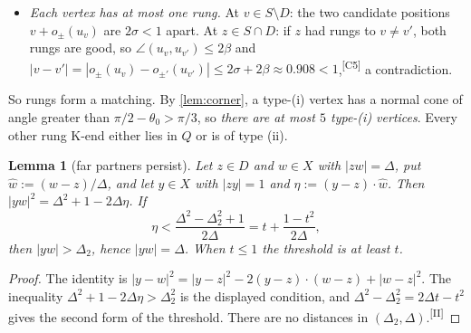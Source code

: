 \documentclass[11pt]{amsart}
\newtheorem{lemma}[theorem]{Lemma}
\theoremstyle{definition}
\theoremstyle{remark}
\newcommand{\Dt}{\Delta_2}
\newcommand{\chk}[1]{\textsuperscript{[#1]}}
\begin{document}
\begin{itemize}[leftmargin=2em]
\item[(R1)] \emph{Each vertex has at most one rung.} At $v\in S\setminus D$: the two candidate positions $v+o_\pm(u_v)$ are $2\sigma<1$ apart. At $z\in S\cap D$: if $z$ had rungs to $v\neq v'$, both rungs are good, so $\angle(u_v,u_{v'})\le2\beta$ and $|v-v'|=|o_{\pm}(u_v)-o_{\pm'}(u_{v'})|\le2\sigma+2\beta\approx0.908<1$,\chk{C5} a contradiction.
\end{itemize}
So rungs form a matching. By \cref{lem:corner}, a type-(i) vertex has a normal cone of angle greater than $\pi/2-\theta_0>\pi/3$, so \emph{there are at most $5$ type-\textup{(i)} vertices}. Every other rung K-end either lies in $Q$ or is of type (ii).

\begin{lemma}[far partners persist]\label{lem:B}
Let $z\in D$ and $w\in X$ with $|zw|=\Delta$, put $\hat w:=(w-z)/\Delta$, and let $y\in X$ with $|zy|=1$ and $\eta:=(y-z)\cdot\hat w$. Then $|yw|^2=\Delta^2+1-2\Delta\eta$. If
\[
\eta<\frac{\Delta^2-\Dt^2+1}{2\Delta}=t+\frac{1-t^2}{2\Delta},
\]
then $|yw|>\Dt$, hence $|yw|=\Delta$. When $t\le1$ the threshold is at least $t$.
\end{lemma}
\begin{proof}
The identity is $|y-w|^2=|y-z|^2-2(y-z)\cdot(w-z)+|w-z|^2$. The inequality $\Delta^2+1-2\Delta\eta>\Dt^2$ is the displayed condition, and $\Delta^2-\Dt^2=2\Delta t-t^2$ gives the second form of the threshold. There are no distances in $(\Dt,\Delta)$.\chk{II}
\end{proof}
\end{document}
